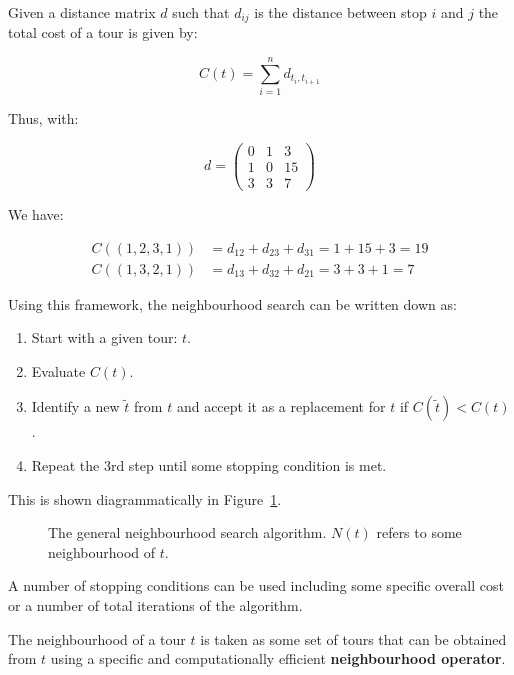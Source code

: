 Given a distance matrix \(d\) such that \(d_{ij}\) is the distance between stop
\(i\) and \(j\) the total cost of a tour is given by:

\[
    C(t)=\sum_{i=1}^{n} d_{t_i, t_{i + 1}}
\]

Thus, with:

\[
    d = \begin{pmatrix}
        0 & 1 & 3\\
        1 & 0 & 15\\
        3 & 3 & 7
        \end{pmatrix}
\]

We have:

\begin{eqnarray*}
    C((1, 2, 3, 1)) &= d_{12} + d_{23} + d_{31} = 1 + 15 + 3 = 19\\
    C((1, 3, 2, 1)) &= d_{13} + d_{32} + d_{21} = 3 + 3 + 1 = 7
\end{eqnarray*}

Using this framework, the neighbourhood search can be written down as:

\begin{enumerate}
    \item Start with a given tour: \(t\).
    \item Evaluate \(C(t)\).
    \item Identify a new \(\tilde t\) from \(t\) and accept it as a replacement
        for \(t\) if \(C(\tilde t)< C(t)\).
    \item Repeat the 3rd step until some stopping condition is met.
\end{enumerate}

This is shown diagrammatically in Figure~\ref{fig:tsp}.

\begin{figure}[!hbtp]
    \begin{center}
        
    \end{center}
    \caption{The general neighbourhood search algorithm. \(N(t)\) refers to some
    neighbourhood of \(t\).}
    \label{fig:tsp}
\end{figure}

A number of stopping conditions can be used including some specific
overall cost or a number of total iterations of the algorithm.

The neighbourhood of a tour \(t\) is taken as some set of tours that can be
obtained from \(t\) using a specific and computationally efficient
\textbf{neighbourhood operator}.

